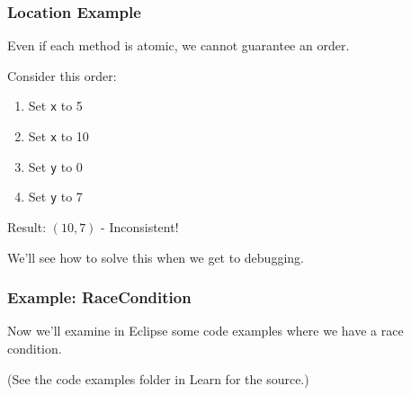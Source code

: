 \begin{frame}
\frametitle{Location Example}
\begin{changemargin}{1cm}
Even if each method is atomic, we cannot guarantee an order.

Consider this order:
\begin{enumerate}
	\item Set \texttt{x} to 5
	\item Set \texttt{x} to 10
	\item Set \texttt{y} to 0
	\item Set \texttt{y} to 7
\end{enumerate} 

Result: $(10, 7)$ - Inconsistent! 

We'll see how to solve this when we get to debugging.

\end{changemargin}
\end{frame}


\begin{frame}
\frametitle{Example: RaceCondition} 
\begin{changemargin}{1cm}

Now we'll examine in Eclipse some code examples where we have a race condition. 

(See the code examples folder in Learn for the source.)


\end{changemargin}
\end{frame}




